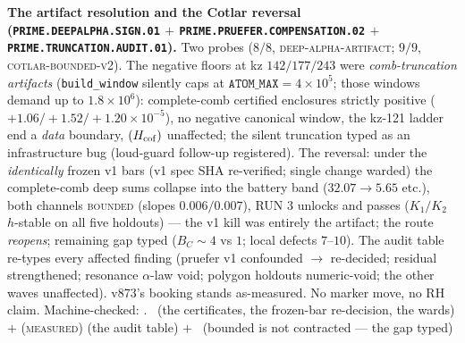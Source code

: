\par\smallskip\noindent\textbf{The artifact resolution and the
Cotlar reversal (\texttt{PRIME.DEEPALPHA.SIGN.01} $+$
\texttt{PRIME.PRUEFER.\allowbreak COMPENSATION.02} $+$
\texttt{PRIME.TRUNCATION.\allowbreak AUDIT.01}).}
Two probes ($8/8$, \textsc{deep-alpha-artifact}; $9/9$,
\textsc{cotlar-bounded-v2}).  The negative floors at kz
$142/177/243$ were \emph{comb-truncation artifacts}
(\texttt{build\_window} silently caps at $\texttt{ATOM\_MAX} =
4\times10^5$; those windows demand up to $1.8\times10^6$):
complete-comb certified enclosures strictly positive
($+1.06/+1.52/+1.20 \times 10^{-5}$), no negative canonical
window, the kz-121 ladder end a \emph{data} boundary, $(H_{\rm
cof})$ unaffected; the silent truncation typed as an
infrastructure bug (loud-guard follow-up registered).  The
reversal: under the \emph{identically} frozen v1 bars (v1 spec
SHA re-verified; single change warded) the complete-comb deep
sums collapse into the battery band ($32.07 \to 5.65$ etc.),
both channels \textsc{bounded} (slopes $0.006/0.007$), RUN 3
unlocks and passes ($K_1/K_2$ $h$-stable on all five holdouts)
--- the v1 kill was entirely the artifact; the route
\emph{reopens}; remaining gap typed ($B_C \sim 4$ vs $1$; local
defects $7$--$10$).  The audit table re-types every affected
finding (pruefer v1 confounded $\to$ re-decided; residual
strengthened; resonance $\alpha$-law void; polygon holdouts
numeric-void; the other waves unaffected).  v873's booking
stands as-measured.  No marker move, no RH claim.
Machine-checked: .
\mE\ (the certificates, the frozen-bar re-decision, the wards)
$+$ (\textsc{measured}) (the audit table) $+$ \mO\ (bounded is
not contracted --- the gap typed)
\par\smallskip


